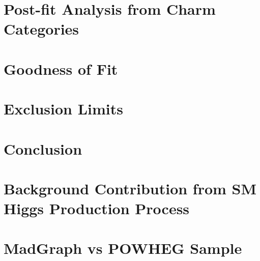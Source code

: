 \newpage
\section{Post-fit Analysis from Charm Categories}

\label{s:secPostFit}

\newpage
\section{Goodness of Fit}
\label{s:secGOF}


\newpage
\section{Exclusion Limits}
\label{s:secLimit}


\newpage
\section{Conclusion}
\label{s:secConcl}



\newpage

\newpage
\appendix

\section{Background Contribution from SM Higgs Production Process}

\label{a:appendHiggsBkg}

\section{MadGraph vs POWHEG Sample}

\label{a:appendMGvsPG}

